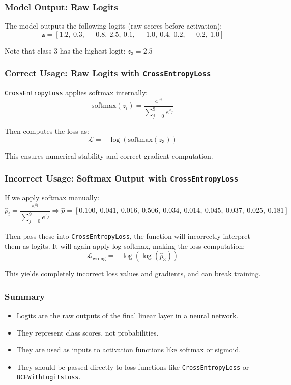 \subsubsection*{Model Output: Raw Logits}

The model outputs the following logits (raw scores before activation):
\[
\mathbf{z} = [1.2,\ 0.3,\ -0.8,\ \mathbf{2.5},\ 0.1,\ -1.0,\ 0.4,\ 0.2,\ -0.2,\ 1.0]
\]

Note that class 3 has the highest logit: $z_3 = 2.5$

\subsubsection*{Correct Usage: Raw Logits with \texttt{CrossEntropyLoss}}

\texttt{CrossEntropyLoss} applies softmax internally:
\[
\text{softmax}(z_i) = \frac{e^{z_i}}{\sum_{j=0}^{9} e^{z_j}}
\]

Then computes the loss as:
\[
\mathcal{L} = -\log \left( \text{softmax}(z_3) \right)
\]

This ensures numerical stability and correct gradient computation.

\subsubsection*{Incorrect Usage: Softmax Output with \texttt{CrossEntropyLoss}}

If we apply softmax manually:
\[
\hat{p}_i = \frac{e^{z_i}}{\sum_{j=0}^{9} e^{z_j}}
\Rightarrow
\hat{p} = [0.100,\ 0.041,\ 0.016,\ \mathbf{0.506},\ 0.034,\ 0.014,\ 0.045,\ 0.037,\ 0.025,\ 0.181]
\]

Then pass these into \texttt{CrossEntropyLoss}, the function will incorrectly interpret them as logits. It will again apply log-softmax, making the loss computation:
\[
\mathcal{L}_{\text{wrong}} = -\log \left( \log(\hat{p}_3) \right)
\]

This yields completely incorrect loss values and gradients, and can break training.



\subsubsection*{Summary}

\begin{itemize}
	\item Logits are the raw outputs of the final linear layer in a neural network.
	\item They represent class scores, not probabilities.
	\item They are used as inputs to activation functions like softmax or sigmoid.
	\item They should be passed directly to loss functions like \texttt{CrossEntropyLoss} or \texttt{BCEWithLogitsLoss}.
\end{itemize}


